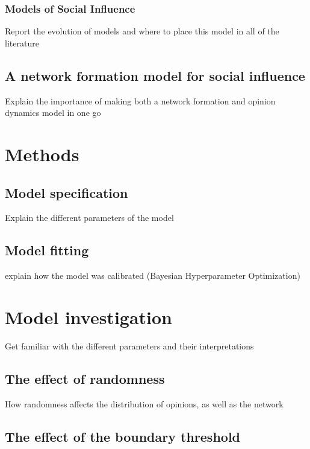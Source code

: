 \documentclass{article}
\begin{document}
\subsubsection{Models of Social Influence}

Report the evolution of models and where to place this model in all of the literature

\subsection{A network formation model for social influence}

Explain the importance of making both a network formation and opinion dynamics model in one go

\section{Methods}

\subsection{Model specification}

Explain the different parameters of the model

\subsection{Model fitting}

explain how the model was calibrated (Bayesian Hyperparameter Optimization)

\section{Model investigation}

Get familiar with the different parameters and their interpretations

\subsection{The effect of randomness}

How randomness affects the distribution of opinions, as well as the network

\subsection{The effect of the boundary threshold}
\end{document}
